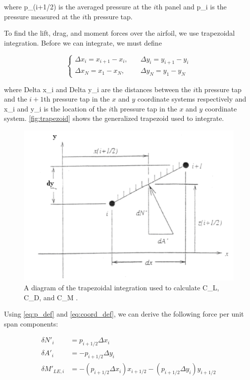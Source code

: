 \noindent where \gls{p_(i+1/2)} is the averaged pressure at the $i$th panel and \gls{p_i} is the pressure measured at the $i$th pressure tap.

To find the lift, drag, and moment forces over the airfoil, we use trapezoidal integration. Before we can integrate, we must define

\begin{equation}\label{eq:coord_def}
    \begin{cases}
        \Delta x_i = x_{i+1} - x_i,&\quad \Delta y_i=y_{i+1}-y_i \\
        \Delta x_N = x_1 - x_N,&\quad\Delta y_N = y_1 - y_N
    \end{cases}
\end{equation}

\noindent where \gls{Delta x_i} and \gls{Delta y_i} are the distances between the $i$th pressure tap and the $i+1$th pressure tap in the $x$ and $y$ coordinate systems respectively and \gls{x_i} and \gls{y_i} is the location of the $i$th pressure tap in the $x$ and $y$ coordinate system. \autoref{fig:trapezoid} shows the generalized trapezoid used to integrate.

\begin{figure}[htpb]
    \centering
    \includegraphics[width=0.75\linewidth]{Figures/trapezoid.png}
    \caption[A diagram of the trapezoidal integration setup]{A diagram of the trapezoidal integration used to calculate \gls{C_L}, \gls{C_D}, and \gls{C_M} \citep{lab5-manual}.}
    \label{fig:trapezoid}
\end{figure}

Using \autoref{eq:p_def} and \autoref{eq:coord_def}, we can derive the following force per unit span components:

\begin{align}
    \delta N'_i &= p_{i+1/2} \Delta x_i \\
    \delta A'_i &= -p_{i+1/2} \Delta y_i \\
    \delta M'_{LE,i} &= -\left(p_{i+1/2} \Delta x_i\right)x_{i+1/2} - \left(p_{i+1/2} \Delta y_i\right)y_{i+1/2}
\end{align}

